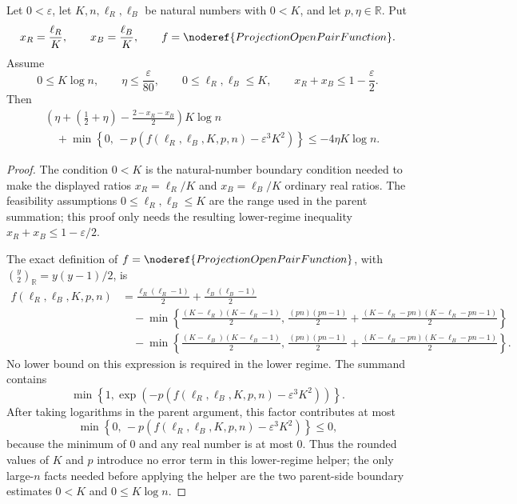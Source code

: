 \begin{lemma}
Let \(0<\varepsilon\), let \(K,n,\ell_R,\ell_B\) be natural numbers with
\(0<K\), and let \(p,\eta\in\mathbb R\).  Put
\[
x_R=\frac{\ell_R}{K},\qquad x_B=\frac{\ell_B}{K},
\qquad
f=\noderef{ProjectionOpenPairFunction}.
\]
Assume
\[
0\le K\log n,\qquad \eta\le\frac{\varepsilon}{80},
\qquad 0\le\ell_R,\ell_B\le K,
\qquad x_R+x_B\le1-\frac{\varepsilon}{2}.
\]
Then
\[
\begin{aligned}
&\left(\eta+\left(\frac12+\eta\right)-\frac{2-x_R-x_B}{2}\right)K\log n\\
&\quad
+\min\left\{0,\,
-p\left(f(\ell_R,\ell_B,K,p,n)-\varepsilon^3K^2\right)\right\}
\le -4\eta K\log n.
\end{aligned}
\]
\end{lemma}
\begin{proof}
The condition \(0<K\) is the natural-number boundary condition needed to make
the displayed ratios \(x_R=\ell_R/K\) and \(x_B=\ell_B/K\) ordinary real
ratios.  The feasibility assumptions \(0\le\ell_R,\ell_B\le K\) are the range
used in the parent summation; this proof only needs the resulting lower-regime
inequality \(x_R+x_B\le1-\varepsilon/2\).

The exact definition of \(f=\noderef{ProjectionOpenPairFunction}\), with
\(\binom y2_{\mathbb R}=y(y-1)/2\), is
\[
\begin{aligned}
f(\ell_R,\ell_B,K,p,n)
&=\frac{\ell_R(\ell_R-1)}2+\frac{\ell_B(\ell_B-1)}2\\
&\quad-\min\left\{
\frac{(K-\ell_R)(K-\ell_R-1)}2,\,
\frac{(pn)(pn-1)}2+
\frac{(K-\ell_R-pn)(K-\ell_R-pn-1)}2
\right\}\\
&\quad-\min\left\{
\frac{(K-\ell_B)(K-\ell_B-1)}2,\,
\frac{(pn)(pn-1)}2+
\frac{(K-\ell_B-pn)(K-\ell_B-pn-1)}2
\right\}.
\end{aligned}
\]
No lower bound on this expression is required in the lower regime.  The
summand contains
\[
\min\left\{1,\exp\left(-p(f(\ell_R,\ell_B,K,p,n)-\varepsilon^3K^2)\right)\right\}.
\]
After taking logarithms in the parent argument, this factor contributes at
most
\[
\min\left\{0,\,
-p\left(f(\ell_R,\ell_B,K,p,n)-\varepsilon^3K^2\right)\right\}\le0, \tag{1}
\]
because the minimum of \(0\) and any real number is at most \(0\).  Thus the
rounded values of \(K\) and \(p\) introduce no error term in this lower-regime
helper; the only large-\(n\) facts needed before applying the helper are the
two parent-side boundary estimates \(0<K\) and \(0\le K\log n\).


\end{proof}
